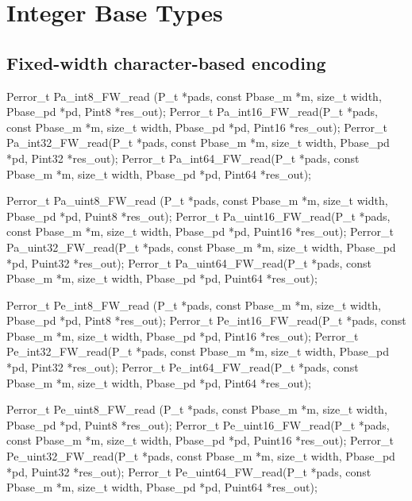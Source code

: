 \section{Integer Base Types}

\subsection{Fixed-width character-based encoding}

\aedBegin{}
\aedEnd{}

\begin{tinycodeaux}{\leftmargin=0in}
Perror_t Pa_int8_FW_read (P_t *pads, const Pbase_m *m, size_t width,
			  Pbase_pd *pd, Pint8 *res_out);
Perror_t Pa_int16_FW_read(P_t *pads, const Pbase_m *m, size_t width,
			  Pbase_pd *pd, Pint16 *res_out);
Perror_t Pa_int32_FW_read(P_t *pads, const Pbase_m *m, size_t width,
			  Pbase_pd *pd, Pint32 *res_out);
Perror_t Pa_int64_FW_read(P_t *pads, const Pbase_m *m, size_t width,
			  Pbase_pd *pd, Pint64 *res_out);

Perror_t Pa_uint8_FW_read (P_t *pads, const Pbase_m *m, size_t width,
			   Pbase_pd *pd, Puint8 *res_out);
Perror_t Pa_uint16_FW_read(P_t *pads, const Pbase_m *m, size_t width,
			   Pbase_pd *pd, Puint16 *res_out);
Perror_t Pa_uint32_FW_read(P_t *pads, const Pbase_m *m, size_t width,
			   Pbase_pd *pd, Puint32 *res_out);
Perror_t Pa_uint64_FW_read(P_t *pads, const Pbase_m *m, size_t width,
			   Pbase_pd *pd, Puint64 *res_out);

Perror_t Pe_int8_FW_read (P_t *pads, const Pbase_m *m, size_t width,
			  Pbase_pd *pd, Pint8 *res_out);
Perror_t Pe_int16_FW_read(P_t *pads, const Pbase_m *m, size_t width,
			  Pbase_pd *pd, Pint16 *res_out);
Perror_t Pe_int32_FW_read(P_t *pads, const Pbase_m *m, size_t width,
			  Pbase_pd *pd, Pint32 *res_out);
Perror_t Pe_int64_FW_read(P_t *pads, const Pbase_m *m, size_t width,
			  Pbase_pd *pd, Pint64 *res_out);

Perror_t Pe_uint8_FW_read (P_t *pads, const Pbase_m *m, size_t width,
			   Pbase_pd *pd, Puint8 *res_out);
Perror_t Pe_uint16_FW_read(P_t *pads, const Pbase_m *m, size_t width,
			   Pbase_pd *pd, Puint16 *res_out);
Perror_t Pe_uint32_FW_read(P_t *pads, const Pbase_m *m, size_t width,
			   Pbase_pd *pd, Puint32 *res_out);
Perror_t Pe_uint64_FW_read(P_t *pads, const Pbase_m *m, size_t width,
			   Pbase_pd *pd, Puint64 *res_out);


\end{tinycodeaux}
